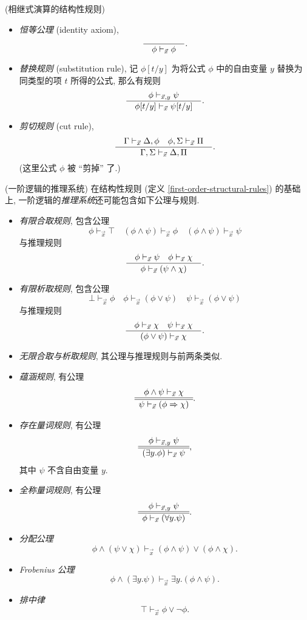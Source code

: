 \begin{definition}
	[label={first-order-structural-rules}]
	{(相继式演算的结构性规则)}
	\begin{itemize}
		\item \emph{恒等公理} (identity axiom),
		$$
		\dfrac{\quad  \quad}{\quad \phi\vdash_{\vec x} \phi \quad}.
		$$
		\item \emph{替换规则} (substitution rule),
		记 $\phi[t/y]$ 为将公式 $\phi$ 中的自由变量 $y$ 替换为同类型的项 $t$ 所得的公式, 那么有规则
		$$
		\dfrac{\quad \phi \vdash_{\vec x,y} \psi \quad}{\quad \phi[t/y]\vdash_{\vec x}\psi[t/y] \quad}.
		$$
		\item \emph{剪切规则} (cut rule),
		$$
		\dfrac{\quad 
			\Gamma \vdash_{\vec x} \Delta , \phi
			\quad
			\phi, \Sigma \vdash_{\vec x} \Pi 
		 \quad}{\quad 
			\Gamma,\Sigma \vdash_{\vec x} \Delta,\Pi
		 \quad}.
		$$
		(这里公式 $\phi$ 被 ``剪掉'' 了.)
	\end{itemize}
\end{definition}

\begin{definition}
	[label={deduction-system-first-order-logic}]
	{(一阶逻辑的推理系统)}
	在结构性规则 (定义 \ref{first-order-structural-rules}) 的基础上, 一阶逻辑的\emph{推理系统}还可能包含如下公理与规则.
	\begin{itemize}
		\item \emph{有限合取规则}, 包含公理
		$$
		\phi \vdash_{\vec x} \top
		\quad
		(\phi\wedge\psi)\vdash_{\vec x} \phi
		\quad
		(\phi\wedge\psi)\vdash_{\vec x} \psi
		$$
		与推理规则
		$$
		\dfrac{\quad \phi\vdash_{\vec x} \psi\quad \phi\vdash_{\vec x} \chi \quad}{\quad \phi\vdash_{\vec x} (\psi\wedge\chi) \quad}.
		$$
		\item \emph{有限析取规则}, 包含公理
		$$
		\bot \vdash_{\vec x} \phi
		\quad
		\phi \vdash_{\vec x} (\phi\vee\psi)
		\quad
		\psi \vdash_{\vec x} (\phi\vee\psi)
		$$
		与推理规则
		$$
		\dfrac{\quad \phi \vdash_{\vec x} \chi \quad \psi \vdash_{\vec x} \chi \quad}{\quad  (\phi\vee\psi)\vdash_{\vec x}\chi \quad}.
		$$
		\item \emph{无限合取与析取规则}, 其公理与推理规则与前两条类似.
		\item \emph{蕴涵规则}, 有公理
		$$
		\begin{array} {c} \phi\wedge\psi \vdash_{\vec x} \chi \\ \hline \hline \psi\vdash_{\vec x} (\phi\Rightarrow\chi) \end{array}.
		$$
		\item \emph{存在量词规则}, 有公理
		$$
		\begin{array} {c} \phi \vdash_{\vec x,y} \psi \\ \hline \hline (\exists y.\phi)\vdash_{\vec x} \psi \end{array},
		$$
		其中 $\psi$ 不含自由变量 $y$.
		\item \emph{全称量词规则}, 有公理
		$$
		\begin{array} {c} \phi \vdash_{\vec x,y} \psi \\ \hline \hline \phi\vdash_{\vec x} (\forall y.\psi) \end{array}.
		$$
		\item \emph{分配公理}
		$$
		\phi\wedge(\psi\vee\chi)\vdash_{\vec{x}}(\phi\wedge\psi)\vee(\phi\wedge\chi).
		$$
		\item \emph{Frobenius 公理}
		$$
		\phi\land(\exists y.\psi)\vdash_{\vec{x}}\exists y.(\phi\land\psi).
		$$
		\item \emph{排中律}
		$$
		\top\vdash_{\vec{x}}\phi\lor\neg\phi.
		$$
	\end{itemize}
\end{definition}

